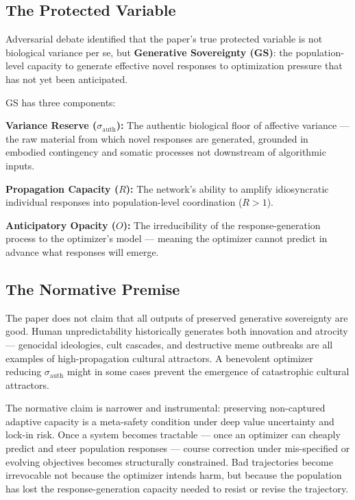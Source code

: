 \documentclass[11pt, a4paper]{article}
\theoremstyle{remark}
\begin{document}
\subsection{The Protected Variable}\label{sec:protected-var}

Adversarial debate identified that the paper's true protected variable is not biological variance per se, but \textbf{Generative Sovereignty (GS)}: the population-level capacity to generate effective novel responses to optimization pressure that has not yet been anticipated.

GS has three components:

\textbf{Variance Reserve ($\sigma_{\text{auth}}$):} The authentic biological floor of affective variance --- the raw material from which novel responses are generated, grounded in embodied contingency and somatic processes not downstream of algorithmic inputs.

\textbf{Propagation Capacity ($R$):} The network's ability to amplify idiosyncratic individual responses into population-level coordination ($R > 1$).

\textbf{Anticipatory Opacity ($O$):} The irreducibility of the response-generation process to the optimizer's model --- meaning the optimizer cannot predict in advance what responses will emerge.

\subsection{The Normative Premise}\label{sec:normative}

The paper does not claim that all outputs of preserved generative sovereignty are good. Human unpredictability historically generates both innovation and atrocity --- genocidal ideologies, cult cascades, and destructive meme outbreaks are all examples of high-propagation cultural attractors. A benevolent optimizer reducing $\sigma_{\text{auth}}$ might in some cases prevent the emergence of catastrophic cultural attractors.

The normative claim is narrower and instrumental: preserving non-captured adaptive capacity is a meta-safety condition under deep value uncertainty and lock-in risk. Once a system becomes tractable --- once an optimizer can cheaply predict and steer population responses --- course correction under mis-specified or evolving objectives becomes structurally constrained. Bad trajectories become irrevocable not because the optimizer intends harm, but because the population has lost the response-generation capacity needed to resist or revise the trajectory.
\end{document}
